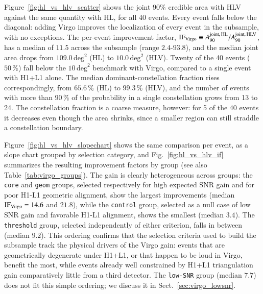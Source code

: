 \documentclass{aa}
\begin{document}
Figure~\ref{fig:hl_vs_hlv_scatter} shows the joint 90\% credible area with
HLV against the same quantity with HL, for all 40 events. Every event falls
below the diagonal: adding Virgo improves the localization of every event
in the subsample, with no exceptions. The per-event improvement factor,
$\mathrm{IF}_{\rm Virgo} \equiv A_{90}^{\rm joint,\,HL}/A_{90}^{\rm joint,\,HLV}$,
has a median of $11.5$ across the subsample (range $2.4$-$93.8$), and the
median joint area drops from $109.0\,\mathrm{deg}^2$ (HL) to
$10.0\,\mathrm{deg}^2$ (HLV). Twenty of the 40 events ($50\,\%$) fall below
the $10\,\mathrm{deg}^2$ benchmark with Virgo, compared to a single event
with H1+L1 alone. The median dominant-constellation fraction rises
correspondingly, from $65.6\,\%$ (HL) to $99.3\,\%$ (HLV), and the number
of events with more than $90\,\%$ of the probability in a single
constellation grows from 13 to 24. The constellation fraction is a coarse
measure, however: for 5 of the 40 events it decreases
even though the area shrinks, since a smaller region can still straddle a
constellation boundary.

Figure~\ref{fig:hl_vs_hlv_slopechart} shows the same comparison per event,
as a slope chart grouped by selection category, and
Fig.~\ref{fig:hl_vs_hlv_if} summarizes the resulting improvement factors by
group (see also Table~\ref{tab:virgo_groups}). The gain is clearly
heterogeneous across groups: the \texttt{core} and \texttt{geom} groups,
selected respectively for high expected SNR gain and for poor H1-L1
geometric alignment, show the largest improvements (median
$\mathrm{IF}_{\rm Virgo} = 14.6$ and $21.8$), while the \texttt{control}
group, selected as a null case of low SNR gain and favorable H1-L1
alignment, shows the smallest (median $3.4$). The \texttt{threshold} group,
selected independently of either criterion, falls in between (median
$9.2$). This ordering confirms that the selection criteria used to build the
subsample track the physical drivers of the Virgo gain: events that are
geometrically degenerate under H1+L1, or that happen to be loud in Virgo,
benefit the most, while events already well constrained by H1+L1
triangulation gain comparatively little from a third detector. The
\texttt{low-SNR} group (median $7.7$) does not fit this simple ordering; we
discuss it in Sect.~\ref{sec:virgo_lowsnr}.
\end{document}
